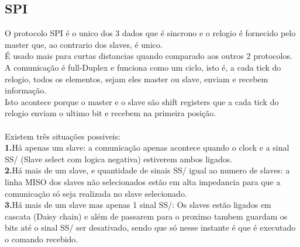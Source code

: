 \documentclass[a4paper, 11pt, onecolumn, oneside]{scrartcl}
\begin{document}
\subsection{SPI}
O protocolo SPI é o unico dos 3 dados que é sincrono e o relogio é fornecido pelo master que, ao contrario dos slaves, é unico.\\
É usado mais para curtas distancias quando comparado aos outros 2 protocolos.\\
\newline
A comunicação é full-Duplex e funciona como um ciclo, isto é, a cada tick do relogio, todos os elementos, sejam eles master ou slave, enviam e recebem informação.\\
Isto acontece porque o master e o slave são shift registers que a cada tick do relogio enviam o ultimo bit e recebem na primeira posição.\\
\newline
\\Existem três situações possiveis:\\
\textbf{1.}Há apenas um slave: a comunicação apenas acontece quando o clock e a sinal SS/ (Slave select com logica negativa) estiverem ambos ligados.\\
\textbf{2.}Há mais de um slave, e quantidade de sinais SS/ igual ao numero de slaves: a linha MISO dos slaves não selecionados estão em alta impedancia para que a comunicação 
só seja realizada no slave selecionado.\\
\textbf{3.}Há mais de um slave mas apenas 1 sinal SS/: Os slaves estão ligados em cascata (Daisy chain) e além de passarem para o proximo tambem guardam os bits até o sinal SS/ ser
desativado, sendo que só nesse instante é que é executado o comando recebido.\\
\end{document}
